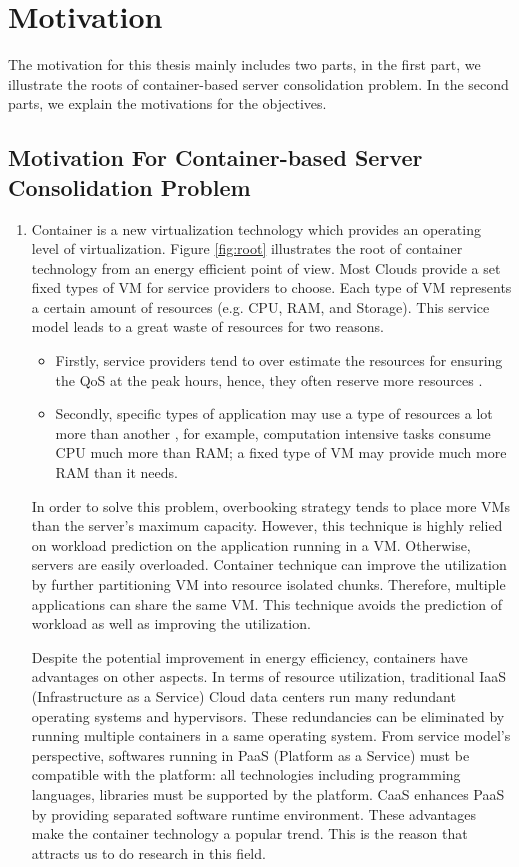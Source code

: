 
\section{Motivation}

The motivation for this thesis mainly includes two parts, in the first part, we illustrate the roots of container-based server consolidation problem. In the second parts, we explain the motivations for the objectives.

\subsection{Motivation For Container-based Server Consolidation Problem}

\begin{enumerate}
\item Container is a new virtualization technology which provides an operating level of virtualization.
Figure \ref{fig:root} illustrates the root of container technology from an energy efficient point of view. Most Clouds provide a set fixed types of VM for service providers to choose. Each type of VM represents a certain amount of resources (e.g. CPU, RAM, and Storage). This service model leads to a great waste of resources for two reasons. 
\begin{itemize}
	\item Firstly, service providers tend to over estimate the resources for ensuring the QoS at the peak hours, hence, they often reserve more resources \cite{Chaisiri:2012cv}. 
	\item Secondly, specific types of application may use a type of resources a lot more than another \cite{Tomas:2013iv}, for example, computation intensive tasks consume CPU much more than RAM; a fixed type of VM may provide much more RAM than it needs.
\end{itemize}
In order to solve this problem, overbooking strategy tends to place more VMs than the server's maximum capacity. However, this technique is highly relied on workload prediction on the application running in a VM. Otherwise, servers are easily overloaded. Container technique can improve the utilization by further partitioning VM into resource isolated chunks. Therefore, multiple applications can share the same VM. This technique avoids the prediction of workload as well as improving the utilization. 

Despite the potential improvement in energy efficiency, containers have advantages on other aspects. In terms of resource utilization, traditional IaaS (Infrastructure as a Service) Cloud data centers run many redundant operating systems and hypervisors. These redundancies can be eliminated by running multiple containers in a same operating system. From service model's perspective, softwares running in PaaS (Platform as a  Service) must be compatible with the platform: all technologies including programming languages, libraries must be supported by the platform. CaaS enhances PaaS by providing separated software runtime environment. These advantages make the container technology a popular trend. This is the reason that attracts us to
do research in this field.


\end{enumerate}
